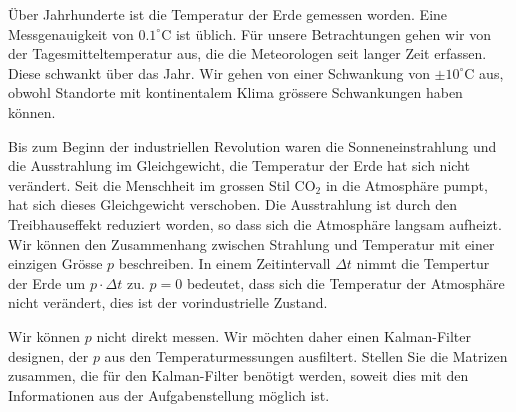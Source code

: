 Über Jahrhunderte ist die Temperatur der Erde gemessen worden.
Eine Messgenauigkeit von $0.1^\circ \text{C}$ ist üblich.
Für unsere Betrachtungen gehen wir von der Tagesmitteltemperatur aus,
die die Meteorologen seit langer Zeit erfassen.
Diese schwankt über das Jahr.
Wir gehen von einer Schwankung von $\pm 10^\circ\text{C}$ aus,
obwohl Standorte mit kontinentalem Klima grössere
Schwankungen haben können.

Bis zum Beginn der industriellen Revolution waren die Sonneneinstrahlung
und die Ausstrahlung im Gleichgewicht, die Temperatur der Erde hat sich
nicht verändert.
Seit die Menschheit im grossen Stil $\text{CO}_2$ in die Atmosphäre
pumpt, hat sich dieses Gleichgewicht verschoben.
Die Ausstrahlung ist durch den Treibhauseffekt reduziert worden,
so dass sich die Atmosphäre langsam aufheizt.
Wir können den Zusammenhang zwischen Strahlung und Temperatur mit einer
einzigen Grösse $p$ beschreiben.
In einem Zeitintervall $\Delta t$ nimmt die Tempertur der Erde um
$p\cdot\Delta t$ zu.
$p=0$ bedeutet, dass sich die Temperatur der Atmosphäre nicht verändert,
dies ist der vorindustrielle Zustand.

Wir können $p$ nicht direkt messen.
Wir möchten daher einen Kalman-Filter designen, der $p$ aus den
Temperaturmessungen ausfiltert.
Stellen Sie die Matrizen zusammen, die für den Kalman-Filter benötigt werden,
soweit dies mit den Informationen aus der Aufgabenstellung möglich ist.


